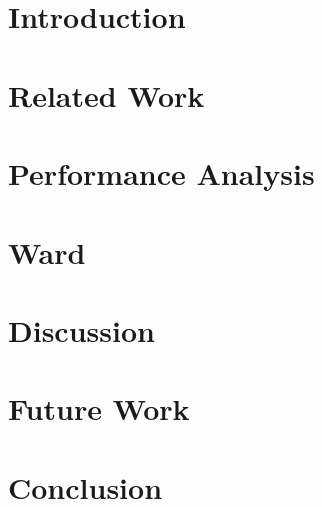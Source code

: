 \documentclass[letterpaper,12pt,oneside]{book}
\begin{document}

~\newpage


~\newpage

%

\tableofcontents

\chapter{Introduction}


\chapter{Related Work}



\chapter{Performance Analysis}







\chapter{Ward}










\chapter{Discussion}

\chapter{Future Work}


\chapter{Conclusion}



\pagebreak
{}

\end{document}
